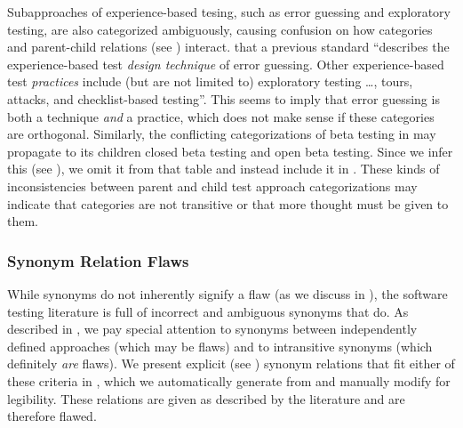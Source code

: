 Subapproaches of experience-based tesing, such as error guessing and
exploratory testing, are also categorized ambiguously, causing confusion on how
categories and parent-child relations (see ) interact.
 \citet[p.~34\ifnotpaper, emphasis added\fi]{IEEE2022}
 that a previous standard \citeyearpar{IEEE2021}
``describes the experience-based test \emph{design technique} of error
guessing. Other experience-based test \emph{practices} include (but are not
limited to) exploratory testing \dots, tours, attacks, and checklist-based
testing''. This seems to imply that error guessing is both a technique
\emph{and} a practice, which does not make sense if these categories are
orthogonal. \ifnotpaper Similarly, the conflicting categorizations of beta
    testing in  may propagate to its children closed beta
    testing and open beta testing. Since we infer this (see ), we
    omit it from that table and instead include it in .
\fi These kinds of inconsistencies between parent and child test approach
categorizations may indicate that categories are not transitive or that more
thought must be given to them.

\ifnotpaper
    \begin{landscape}
        
    \end{landscape}
\else %
\fi

\subsubsection{Synonym Relation Flaws}\label{syns}

While synonyms do not inherently signify a flaw (as we discuss in
), the software testing literature is full of incorrect and
ambiguous synonyms that do. As described in , we pay
special attention to synonyms between independently defined approaches (which
may be flaws) and to intransitive synonyms (which definitely \emph{are} flaws).
\ifnotpaper We present explicit (see ) synonym relations that
    fit either of these criteria in \utd{}, which we
    automatically generate from \ourApproachGlossary{} and manually modify for
    legibility. These relations are given as described by the literature and are
    therefore flawed.

